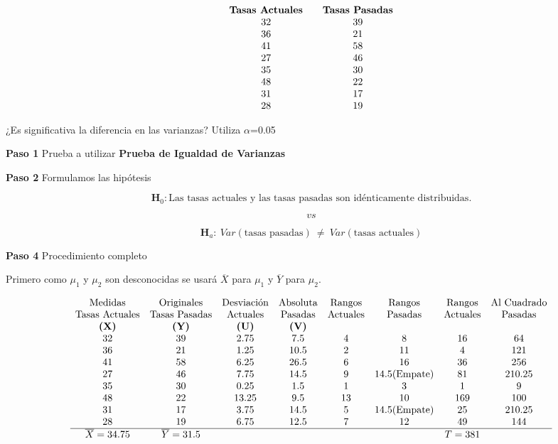 \documentclass[
  a4paper,
  oneside,
  openany]{book}
\begin{document}
\[
\begin{array}{c c c} 
\textbf{Tasas Actuales} &  & \textbf{Tasas Pasadas} \\
32 & & 39 \\
36 & & 21 \\
41 & & 58 \\
27 & & 46 \\
35 & & 30 \\
48 & & 22 \\
31 & & 17 \\
28 & & 19 \\
\end{array}
\]

¿Es significativa la diferencia en las varianzas? Utiliza \(\alpha\)=0.05

\textbf{Paso 1} Prueba a utilizar \textbf{Prueba de Igualdad de Varianzas}

\textbf{Paso 2} Formulamos las hipótesis

\[\textbf{H}_0: \mbox{Las tasas actuales y las tasas pasadas son idénticamente distribuidas.}\]

\[vs\]

\[\textbf{H}_a: \ Var(\mbox{tasas pasadas}) \ \neq  \ Var(\mbox{tasas actuales})\]

\textbf{Paso 4} Procedimiento completo

Primero como \(\mu_{1}\) y \(\mu_{2}\) son desconocidas se usará \(\overline{X}\) para \(\mu_{1}\) y \(\overline{Y}\) para \(\mu_{2}\).

\[
\begin{array}{c c c c c c c c }
\mbox{Medidas} & \mbox{Originales} & \mbox{Desviación} & \mbox{Absoluta} & \mbox{Rangos} & \mbox{Rangos} & \mbox{Rangos} & \mbox{Al Cuadrado} \\
\mbox{Tasas Actuales} & \mbox{Tasas Pasadas} & \mbox{Actuales} & \mbox{Pasadas} & \mbox{Actuales} & \mbox{Pasadas}& \mbox{Actuales} & \mbox{Pasadas} \\
\textbf{(X)} & \textbf{(Y)} & \textbf{(U)}   & \textbf{(V)}  &     &               &     &         \\
32  & 39  & 2.75  & 7.5  &  4  &  8            & 16  &  64         \\
36  & 21  & 1.25  & 10.5 &  2  &  11           &  4  &  121    \\
41  & 58  & 6.25  & 26.5 &  6 &   16           & 36  &  256       \\
27  & 46  & 7.75  & 14.5 &  9  &  14.5(\mbox{Empate})& 81  &  210.25       \\
35  & 30  & 0.25  & 1.5  &  1  &  3            & 1   &  9     \\
48  & 22  & 13.25 & 9.5  &  13 &  10           & 169 &  100    \\
31  & 17  & 3.75  & 14.5 &  5  &  14.5(\mbox{Empate})& 25  &  210.25     \\
28  & 19  & 6.75  & 12.5 &  7  &  12           & 49  &  144   \\
\hline
\overline{X}= 34.75 & \overline{Y}= 31.5 & & & & & T=381
\end{array}
\]
\end{document}
